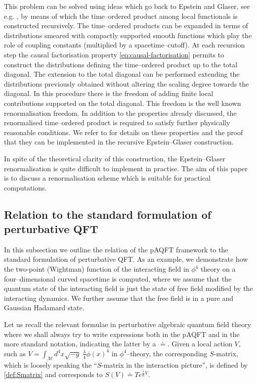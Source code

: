 \documentclass[a4paper,10pt,twoside]{article}
\numberwithin{equation}{section}
\newcounter{and}
\def\M{\mathcal{M}}
\theoremstyle{plain}
\theoremstyle{definition}
\begin{document}
This problem can be solved using ideas which go back to Epstein and Glaser, see e.g. \cite{Brunetti-Fredenhagen:2000}, by means of which the time--ordered product among local functionals is constructed recursively.
The time--ordered products can be expanded in terms of distributions smeared with compactly supported smooth functions which play the role of coupling constants (multiplied by a spacetime--cutoff). At each recursion step the causal factorisation property \eqref{eq:causal-factorisation} permits to construct the distributions defining the time--ordered product up to the total diagonal. 
The extension to the total diagonal can be performed extending the distributions previously obtained without altering the scaling degree towards the diagonal. In this procedure there is the freedom of adding finite local contributions supported on the total diagonal. This freedom is the well known renormalisation freedom. In addition to the properties already discussed, the renormalised time--ordered product is required to satisfy further physically reasonable conditions. We refer to \cite{Hollands:2001b,Hollands:2004yh} for details on these properties and the proof that they can be implemented in the recursive Epstein--Glaser construction.

In spite of the theoretical clarity of this construction, the Epstein--Glaser renormalisation is quite difficult to implement in practise. The aim of this paper is to discuss a renormalisation scheme which is suitable for practical computations.


\subsection{Relation to the standard formulation of perturbative QFT}
\label{sec:relationPAQFT}

In this subsection we outline the relation of the pAQFT framework to the standard formulation of perturbative QFT. As an example, we demonstrate how the two-point (Wightman) function of the interacting field in $\phi^4$ theory on a four--dimensional curved spacetime is computed, where we assume that the quantum state of the interacting field is just the state of free field modified by the interacting dynamics. We further assume that the free field is in a pure and Gaussian Hadamard state. 

Let us recall the relevant formulae in perturbative algebraic quantum field theory where we shall always try to write expressions both in the pAQFT and in the more standard notation, indicating the latter by a $\doteq$. Given a local action $V$, such as $V=\int_\M d^4x \sqrt{-g} \; \frac{\lambda}{4} \phi(x)^4$ in $\phi^4$--theory, the corresponding $S$-matrix, which is loosely speaking the ``$S$-matrix in the interaction picture'', is defined by \eqref{def:Smatrix} and corresponds to $S(V)\doteq T e^{\frac{i}{\hbar} V}$.
\end{document}
